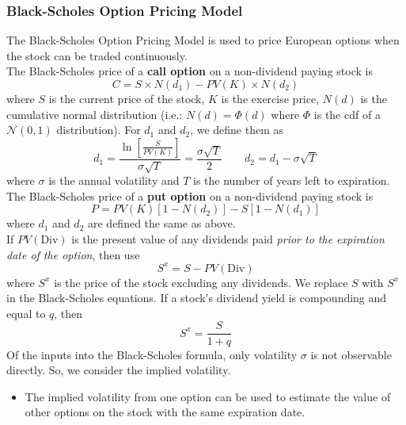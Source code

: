 \documentclass[11pt]{article}
\theoremstyle{definition}
\begin{document}
\subsubsection{Black-Scholes Option Pricing Model}
The Black-Scholes Option Pricing Model is used to price European options when the stock can be traded continuously. \\
The Black-Scholes price of a \textbf{call option} on a non-dividend paying stock is 
\begin{equation*}
    C = S \times N(d_1)  - PV(K) \times N(d_2)
\end{equation*}
where $S$ is the current price of the stock, $K$ is the exercise price, $N(d)$ is the cumulative normal distribution (i.e.: $N(d) = \Phi(d)$ where $\Phi$ is the cdf of a $\mathcal N(0, 1) $ distribution). For $d_1$ and $d_2$, we define them as 
\begin{equation*}
    d_1 = \frac{\ln\left[\frac{S}{PV(K)}\right]}{\sigma\sqrt T} = \frac{\sigma\sqrt{T}}{2} \qquad d_2 = d_1 - \sigma\sqrt{T}
\end{equation*}
where $\sigma$ is the annual volatility and $T$ is the number of years left to expiration.\\
The Black-Scholes price of a \textbf{put option} on a non-dividend paying stock is 
\begin{equation*}
    P = PV(K)[1 - N(d_2)] - S[1 - N(d_1)]
\end{equation*}
where $d_1$ and $d_2$ are defined the same as above. \\
If $PV(\text{Div})$ is the present value of any dividends paid \textit{prior to the expiration date of the option}, then use 
\begin{equation*}
    S^x = S - PV(\text{Div})
\end{equation*}
where $S^x$ is the price of the stock excluding any dividends. We replace $S$ with $S^x$ in the Black-Scholes equations. If a stock's dividend yield is compounding and equal to $q$, then 
\begin{equation*}
    S^x = \frac{S}{1 + q}
\end{equation*}
Of the inputs into the Black-Scholes formula, only volatility $\sigma$ is not observable directly. So, we consider the implied volatility.
\begin{itemize}
    \item The implied volatility from one option can be used to estimate the value of other options on the stock with the same expiration date.
\end{itemize}
\end{document}
